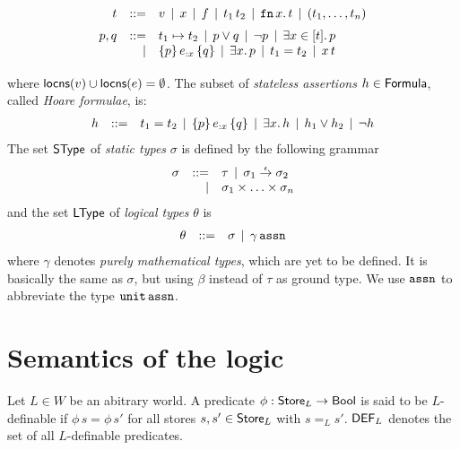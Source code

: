\documentclass[12pt,a4paper]{report}
\newcommand{\ssto}{\nstyle{sto}}
\newcommand{\DEF}{\sstyle{DEF}}
\begin{document}
\[\GRbeg
  t \GRis v \GRmid x \GRmid f \GRmid \app{t_1}{t_2} \GRmid \tabstr{x}{t} \GRmid (t_1,\ldots,t_n)
    \GRnl

  p,q \GRis t_1 \mapsto t_2 \GRmid p \vee q \GRmid \neg p \GRmid \qbex{x}{t}{p}
      \GRal \triple{p}{e_{:x}}{q} \GRmid \qex{x}{p} \GRmid t_1 = t_2 \GRmid x\,t
      \GRnl
\GRend\]
where $\mathsf{locns}(v) \cup \mathsf{locns}(e) = \emptyset$.
The subset of {\em stateless assertions} $h \in \mathsf{Formula}$, called {\em Hoare formulae}, is:
\[\begin{array}{rrlll}
  h & ::= & t_1 = t_2 \,\mid\, \{p\}\,e_{:x}\,\{q\} \,\mid\, \exists{x}.\,{h} \,\mid\, h_1 \vee h_2 \,\mid\, \neg h
\end{array}\]
The set $\mathsf{SType}$ of {\em static types} $\sigma$ is defined by the following grammar
\[\begin{array}{rrlll}
  \sigma & ::= & \tau \,\mid\, \sigma_1\stackrel{_t}{\to}\sigma_2
  \\ & \mid & \sigma_1 \times \ldots \times \sigma_n
\end{array}\]
and the set $\mathsf{LType}$ of {\em logical types} $\theta$ is
\[\begin{array}{rrlll}
  \theta & ::= & \sigma \,\mid\, \gamma\,\mathtt{assn}
\end{array}\]
where $\gamma$ denotes {\em purely mathematical types}, which are yet to be defined. It is basically
the same as $\sigma$, but using $\beta$ instead of $\tau$ as ground type.
We use $\mathtt{assn}$ to abbreviate the type $\mathtt{unit}\,\mathtt{assn}$.



\section{Semantics of the logic}

\begin{definition}[$L$-definability]
  Let $L\in W$ be an abitrary world. A predicate $\phi : \mathsf{Store}_L \to \mathsf{Bool}$ is said to be $L$-definable
  if $\phi\,s = \phi\,s'$ for all stores $s,s' \in \mathsf{Store}_L$ with $s =_L s'$. $\DEF_L$ denotes the set of
  all $L$-definable predicates.
\end{definition}


\end{document}

